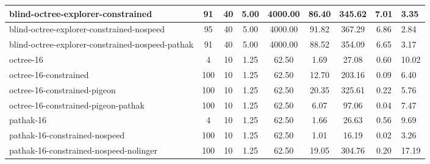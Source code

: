 \begin{sidewaystable}
\begin{longtable}{|l|c|c|c|c|c|c|c|}
blind-octree-explorer-constrained & {} \color[HTML]{000000} 91 & 40 & 5.00 & {} \color[HTML]{F1F1F1} 4000.00 & 86.40 & {} \color[HTML]{F1F1F1} 345.62 & 7.01 & 3.35 \\ \hline
blind-octree-explorer-constrained-nospeed & {} \color[HTML]{000000} 95 & 40 & 5.00 & {} \color[HTML]{F1F1F1} 4000.00 & 91.82 & {} \color[HTML]{F1F1F1} 367.29 & 6.86 & 2.84 \\ \hline
blind-octree-explorer-constrained-nospeed-pathak & {} \color[HTML]{000000} 91 & 40 & 5.00 & {} \color[HTML]{F1F1F1} 4000.00 & 88.52 & {} \color[HTML]{F1F1F1} 354.09 & 6.65 & 3.17 \\ \hline
octree-16 & {} \color[HTML]{000000} 4 & 10 & 1.25 & {} \color[HTML]{000000} 62.50 & 1.69 & {} \color[HTML]{000000} 27.08 & 0.60 & 10.02 \\ \hline
octree-16-constrained & {} \color[HTML]{F1F1F1} 100 & 10 & 1.25 & {} \color[HTML]{000000} 62.50 & 12.70 & {} \color[HTML]{000000} 203.16 & 0.09 & 6.40 \\ \hline
octree-16-constrained-pigeon & {} \color[HTML]{F1F1F1} 100 & 10 & 1.25 & {} \color[HTML]{000000} 62.50 & 20.35 & {} \color[HTML]{F1F1F1} 325.61 & 0.22 & 5.76 \\ \hline
octree-16-constrained-pigeon-pathak & {} \color[HTML]{F1F1F1} 100 & 10 & 1.25 & {} \color[HTML]{000000} 62.50 & 6.07 & {} \color[HTML]{000000} 97.06 & 0.04 & 7.47 \\ \hline
pathak-16 & {} \color[HTML]{000000} 4 & 10 & 1.25 & {} \color[HTML]{000000} 62.50 & 1.66 & {} \color[HTML]{000000} 26.63 & 0.56 & 9.69 \\ \hline
pathak-16-constrained-nospeed & {} \color[HTML]{F1F1F1} 100 & 10 & 1.25 & {} \color[HTML]{000000} 62.50 & 1.01 & {} \color[HTML]{000000} 16.19 & 0.02 & 3.26 \\ \hline
pathak-16-constrained-nospeed-nolinger & {} \color[HTML]{F1F1F1} 100 & 10 & 1.25 & {} \color[HTML]{000000} 62.50 & 19.05 & {} \color[HTML]{000000} 304.76 & 0.20 & 17.19 \\ \hline

\end{longtable}
\end{sidewaystable}
